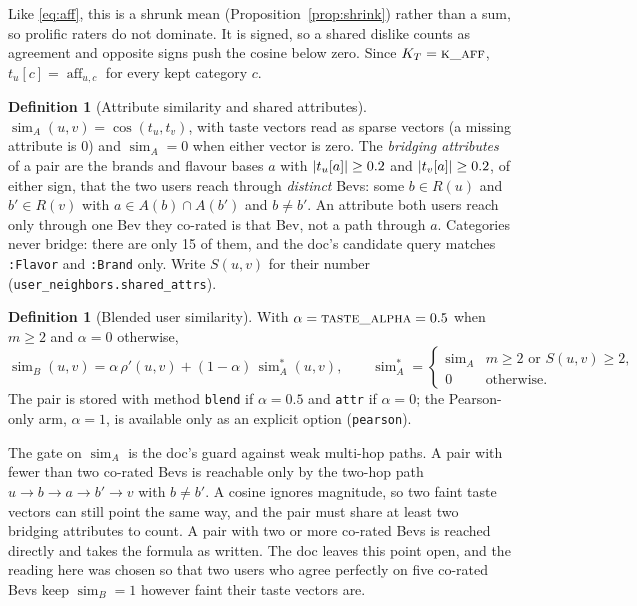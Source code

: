 \documentclass[11pt]{article}
\DeclarePairedDelimiter\abs{\lvert}{\rvert}
\DeclareMathOperator{\simi}{sim}
\DeclareMathOperator{\cosim}{cos}
\DeclareMathOperator{\aff}{aff}
\newcommand{\code}[1]{\texttt{#1}}
\theoremstyle{plain}
\theoremstyle{definition}
\newtheorem{definition}[theorem]{Definition}
\theoremstyle{remark}
\begin{document}
Like \eqref{eq:aff}, this is a shrunk mean (Proposition~\ref{prop:shrink}) rather than a sum, so prolific raters do not dominate. It is signed, so a shared dislike counts as agreement and opposite signs push the cosine below zero. Since $K_T = \textsc{k\_aff}$, $t_u[c] = \aff_{u,c}$ for every kept category $c$.

\begin{definition}[Attribute similarity and shared attributes]\label{def:attrsim}
$\simi_A(u, v) = \cosim(t_u, t_v)$, with taste vectors read as sparse vectors (a missing attribute is $0$) and $\simi_A = 0$ when either vector is zero. The \emph{bridging attributes} of a pair are the brands and flavour bases $a$ with $\abs{t_u[a]} \ge 0.2$ and $\abs{t_v[a]} \ge 0.2$, of either sign, that the two users reach through \emph{distinct} Bevs: some $b \in R(u)$ and $b' \in R(v)$ with $a \in A(b) \cap A(b')$ and $b \ne b'$. An attribute both users reach only through one Bev they co-rated is that Bev, not a path through $a$. Categories never bridge: there are only 15 of them, and the doc's candidate query matches \code{:Flavor} and \code{:Brand} only. Write $S(u, v)$ for their number (\code{user\_neighbors.shared\_attrs}).
\end{definition}

\begin{definition}[Blended user similarity]\label{def:blend-sim}
With $\alpha = \textsc{taste\_alpha} = 0.5$ when $m \ge 2$ and $\alpha = 0$ otherwise,
\begin{equation}\label{eq:blendsim}
\simi_B(u, v) = \alpha\, \rho'(u, v) + (1 - \alpha)\, \simi^\ast_A(u, v),
\qquad
\simi^\ast_A =
\begin{cases}
\simi_A & m \ge 2 \text{ or } S(u, v) \ge 2, \\
0 & \text{otherwise.}
\end{cases}
\end{equation}
The pair is stored with method \code{blend} if $\alpha = 0.5$ and \code{attr} if $\alpha = 0$; the Pearson-only arm, $\alpha = 1$, is available only as an explicit option (\code{pearson}).
\end{definition}

The gate on $\simi_A$ is the doc's guard against weak multi-hop paths. A pair with fewer than two co-rated Bevs is reachable only by the two-hop path $u \to b \to a \to b' \to v$ with $b \ne b'$. A cosine ignores magnitude, so two faint taste vectors can still point the same way, and the pair must share at least two bridging attributes to count. A pair with two or more co-rated Bevs is reached directly and takes the formula as written. The doc leaves this point open, and the reading here was chosen so that two users who agree perfectly on five co-rated Bevs keep $\simi_B = 1$ however faint their taste vectors are.
\end{document}
